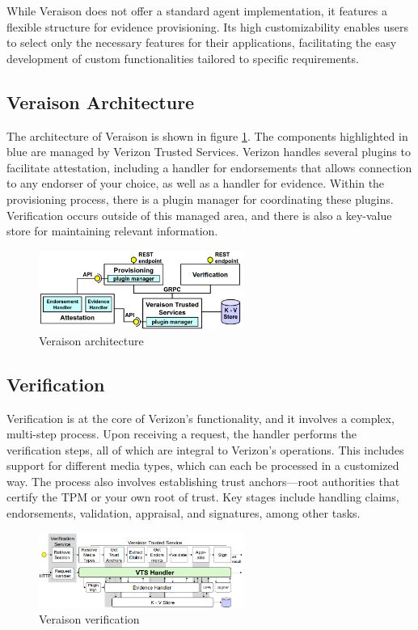 While Veraison does not offer a standard agent implementation, it
features a flexible structure for evidence provisioning. Its high
customizability enables users to select only the necessary features
for their applications, facilitating the easy development of custom
functionalities tailored to specific requirements.

\subsection{Veraison Architecture}
The architecture of Veraison is shown in figure
\ref{fig:veraison-architecture}. The components highlighted in blue
are managed by Verizon Trusted Services. Verizon handles several
plugins to facilitate attestation, including a handler for
endorsements that allows connection to any endorser of your choice, as
well as a handler for evidence. Within the provisioning process, there
is a plugin manager for coordinating these plugins. Verification
occurs outside of this managed area, and there is also a key-value
store for maintaining relevant information. 
\begin{figure}[H]
  \centering
  \includegraphics[width=0.6\textwidth]{img/veraison architecture.png}
  \caption{Veraison architecture}
  \label{fig:veraison-architecture}
\end{figure}

\subsection{Verification}
Verification is at the core of Verizon's functionality, and it
involves a complex, multi-step process. Upon receiving a request, the
handler performs the verification steps, all of which are integral to
Verizon’s operations. This includes support for different media types,
which can each be processed in a customized way. The process also
involves establishing trust anchors—root authorities that certify the
TPM or your own root of trust. Key stages include handling claims,
endorsements, validation, appraisal, and signatures, among other
tasks.

\begin{figure}[H]
  \centering
  \includegraphics[width=0.6\textwidth]{img/verizon verification.png}
  \caption{Veraison verification}
\end{figure}
